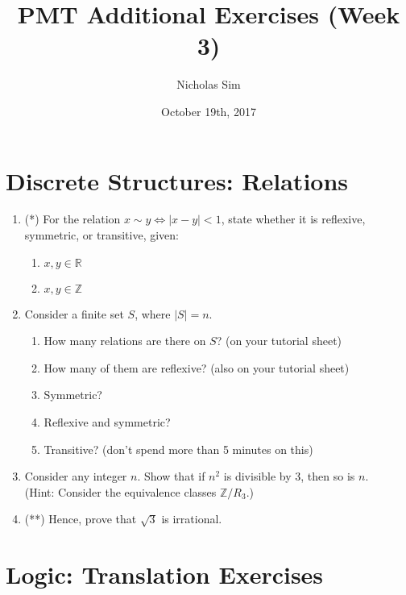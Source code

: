 \documentclass[10pt,a4paper]{article}
\begin{document}
\title{PMT Additional Exercises (Week 3)}
\author{Nicholas Sim}
\date{October 19th, 2017}
\maketitle{}


\section{Discrete Structures: Relations}

\begin{enumerate}
    \item (*) For the relation \(x \sim y \Leftrightarrow | x - y | < 1 \), state whether it is reflexive, symmetric, or transitive, given:
    \begin{enumerate}
        \item \(x, y \in \mathbb{R} \)
        \item \(x, y \in \mathbb{Z} \)
    \end{enumerate}

    \item Consider a finite set \( S \), where \( |S| = n\).
    \begin{enumerate}
        \item How many relations are there on \( S \)? (on your tutorial sheet)
        \item How many of them are reflexive? (also on your tutorial sheet)
        \item Symmetric?
        \item Reflexive and symmetric?
        \item Transitive? (don't spend more than 5 minutes on this)
    \end{enumerate}

    \item Consider any integer \( n \). Show that if \( n^2 \) is divisible by 3, then so is \( n \). \\
    (Hint: Consider the equivalence classes \( \mathbb{Z} / R_3 \).)

    \item (**) Hence, prove that \( \sqrt{3} \) is irrational.
\end{enumerate}


\section{Logic: Translation Exercises}
\end{document}
